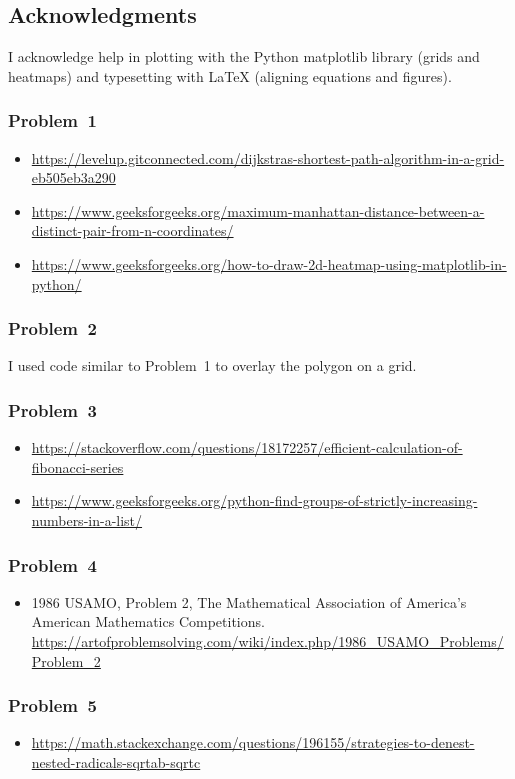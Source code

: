 
\newpage\clearpage
\subsection*{Acknowledgments}

I acknowledge help in plotting with the Python matplotlib library (grids and heatmaps) and typesetting with LaTeX (aligning equations and figures). 

\subsubsection*{Problem~1}
\begin{itemize}
\item \url{https://levelup.gitconnected.com/dijkstras-shortest-path-algorithm-in-a-grid-eb505eb3a290}
\item \url{https://www.geeksforgeeks.org/maximum-manhattan-distance-between-a-distinct-pair-from-n-coordinates/}
\item \url{https://www.geeksforgeeks.org/how-to-draw-2d-heatmap-using-matplotlib-in-python/}
\end{itemize}

\subsubsection*{Problem~2}
I used code similar to Problem~1 to overlay the polygon on a grid. 

\subsubsection*{Problem~3}
\begin{itemize}
\item \url{https://stackoverflow.com/questions/18172257/efficient-calculation-of-fibonacci-series}
\item \url{https://www.geeksforgeeks.org/python-find-groups-of-strictly-increasing-numbers-in-a-list/}
\end{itemize}

\subsubsection*{Problem~4}
\begin{itemize}
\item 1986 USAMO, Problem 2, The Mathematical Association of America's American Mathematics Competitions. 
\url{https://artofproblemsolving.com/wiki/index.php/1986_USAMO_Problems/Problem_2}
\end{itemize}

\subsubsection*{Problem~5}
\begin{itemize}
\item \url{https://math.stackexchange.com/questions/196155/strategies-to-denest-nested-radicals-sqrtab-sqrtc}
\end{itemize}
